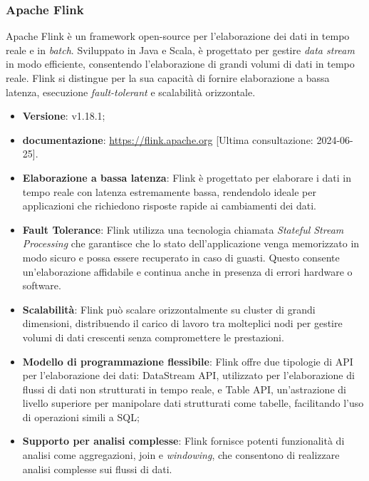 \subsubsection{Apache Flink} \label{sec:flink}
Apache Flink è un framework open-source per l'elaborazione dei dati in tempo reale e in \textit{batch}.
Sviluppato in Java e Scala, è progettato per gestire \textit{data stream} in modo efficiente, consentendo l'elaborazione di grandi volumi di dati in tempo reale.
Flink si distingue per la sua capacità di fornire elaborazione a bassa latenza, esecuzione \textit{fault-tolerant} e scalabilità orizzontale.

\begin{itemize}
	\item \textbf{Versione}: v1.18.1;
	\item \textbf{documentazione}: \url{https://flink.apache.org} [Ultima consultazione: 2024-06-25].
\end{itemize}

\begin{itemize}
	\item \textbf{Elaborazione a bassa latenza}: Flink è progettato per elaborare i dati in tempo reale con latenza estremamente bassa, rendendolo ideale per applicazioni che richiedono risposte rapide ai cambiamenti dei dati.
	\item \textbf{Fault Tolerance}: Flink utilizza una tecnologia chiamata \textit{Stateful Stream Processing} che garantisce che lo stato dell'applicazione venga memorizzato in modo sicuro e possa essere recuperato in caso di guasti. Questo consente un'elaborazione affidabile e continua anche in presenza di errori hardware o software.
	\item \textbf{Scalabilità}: Flink può scalare orizzontalmente su cluster di grandi dimensioni, distribuendo il carico di lavoro tra molteplici nodi per gestire volumi di dati crescenti senza compromettere le prestazioni.
	\item \textbf{Modello di programmazione flessibile}: Flink offre due tipologie di API per l'elaborazione dei dati: DataStream API, utilizzato per l'elaborazione di flussi di dati non strutturati in tempo reale, e Table API, un'astrazione di livello superiore per manipolare dati strutturati come tabelle, facilitando l'uso di operazioni simili a SQL;
	\item \textbf{Supporto per analisi complesse}: Flink fornisce potenti funzionalità di analisi come aggregazioni, join e \textit{windowing}, che consentono di realizzare analisi complesse sui flussi di dati.
\end{itemize}

